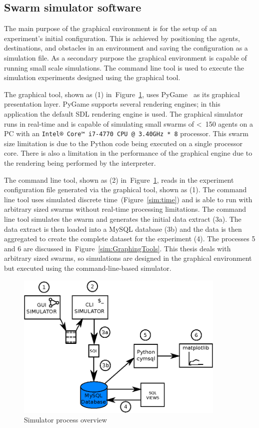 \subsection{Swarm simulator software}\label{sim:Simulator2}
The main purpose of the graphical environment is for the setup of an experiment's initial configuration. This is achieved by positioning the agents, destinations, and obstacles in an environment and saving the configuration as a simulation file. As a secondary purpose the graphical environment is capable of running small scale simulations. The command line tool is used to execute the simulation experiments designed using the graphical tool. 

The graphical tool, shown as (1) in~Figure~\ref{sim:SimulatorOverview}, uses PyGame~\cite{PYGAME:15} as its graphical presentation layer. PyGame supports several rendering engines; in this application the default SDL rendering engine is used. The graphical simulator runs in real-time and is capable of simulating small swarms of \textless~150 agents on a PC with an \texttt{Intel® Core™ i7-4770 CPU @ 3.40GHz * 8} processor. This swarm size limitation is due to the Python code being executed on a single processor core. There is also a limitation in the performance of the graphical engine due to the rendering being performed by the interpreter.
 
The command line tool, shown as (2) in~Figure~\ref{sim:SimulatorOverview}, reads in the experiment configuration file generated via the graphical tool, shown as (1). The command line tool uses simulated discrete time~(Figure~\ref{sim:time}) and is able to run with arbitrary sized swarms without real-time processing limitations. The command line tool simulates the swarm and generates the initial data extract (3a). The data extract is then loaded into a MySQL database (3b) and the data is then aggregated to create the complete dataset for the experiment (4). The processes 5 and 6 are discussed in~Figure~\ref{sim:GraphingTools}.  This thesis deals with arbitrary sized swarms, so simulations are designed in the graphical environment but executed using the command-line-based simulator. 

\begin{figure}[H]
\begin{center}
\includegraphics[width=10cm]{CHAPTER-3/figures/SimulatorProcess}
\end{center}
\caption{Simulator process overview\label{sim:SimulatorOverview}}
\end{figure}

